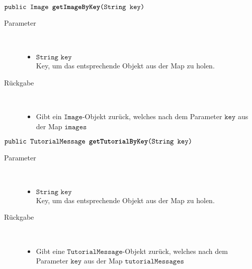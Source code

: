 \begin{description}
		\item $\texttt{public Image \textbf{getImageByKey}(String key)}$\\ 
		\begin{description}
			\item[Parameter] \hfill \\
			\vspace{-.8cm}
			\begin{itemize}
				\item $\texttt{String key}$ \\ Key, um das entsprechende Objekt aus der Map zu holen.
			\end{itemize}
			\item[Rückgabe] \hfill \\
			\vspace{-.8cm}
			\begin{itemize}
				\item Gibt ein $\texttt{Image}$-Objekt zurück, welches nach dem Parameter $\texttt{key}$ aus der Map $\texttt{images}$
			\end{itemize}
			\end{description}

		\item $\texttt{public TutorialMessage \textbf{getTutorialByKey}(String key)}$ \\ 
		\begin{description}
			\item[Parameter] \hfill \\
			\vspace{-.8cm}
			\begin{itemize}
				\item $\texttt{String key}$ \\ Key, um das entsprechende Objekt aus der Map zu holen.
			\end{itemize}
			\item[Rückgabe] \hfill \\
			\vspace{-.8cm}
			\begin{itemize}
				\item Gibt eine $\texttt{TutorialMessage}$-Objekt zurück, welches nach dem Parameter $\texttt{key}$ aus der Map $\texttt{tutorialMessages}$
			\end{itemize}
			\end{description}
			

\end{description}
